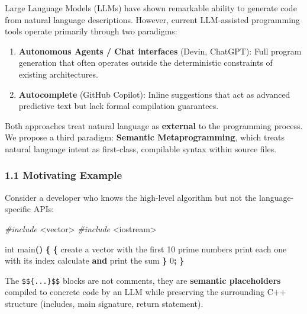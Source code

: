 \documentclass[11pt, a4paper]{article}
\providecommand{\tightlist}{\setlength{\itemsep}{0pt}\setlength{\parskip}{0pt}}
\newenvironment{Shaded}{\begin{snugshade}}{\end{snugshade}}
\newcommand{\DataTypeTok}[1]{\textcolor[rgb]{0.13,0.29,0.53}{#1}}
\newcommand{\DecValTok}[1]{\textcolor[rgb]{0.00,0.00,0.81}{#1}}
\newcommand{\ErrorTok}[1]{\textcolor[rgb]{0.64,0.00,0.00}{\textbf{#1}}}
\newcommand{\ImportTok}[1]{#1}
\newcommand{\KeywordTok}[1]{\textcolor[rgb]{0.13,0.29,0.53}{\textbf{#1}}}
\newcommand{\NormalTok}[1]{#1}
\newcommand{\OperatorTok}[1]{\textcolor[rgb]{0.81,0.36,0.00}{\textbf{#1}}}
\newcommand{\PreprocessorTok}[1]{\textcolor[rgb]{0.56,0.35,0.01}{\textit{#1}}}
\begin{document}
Large Language Models (LLMs) have shown remarkable ability to generate
code from natural language descriptions. However, current LLM-assisted
programming tools operate primarily through two paradigms:

\begin{enumerate}
\def\labelenumi{\arabic{enumi}.}
\tightlist
\item
  \textbf{Autonomous Agents / Chat interfaces} (Devin, ChatGPT): Full
  program generation that often operates outside the deterministic
  constraints of existing architectures.
\item
  \textbf{Autocomplete} (GitHub Copilot): Inline suggestions that act as
  advanced predictive text but lack formal compilation guarantees.
\end{enumerate}

Both approaches treat natural language as \textbf{external} to the
programming process. We propose a third paradigm: \textbf{Semantic
Metaprogramming}, which treats natural language intent as first-class,
compilable syntax within source files.

\subsubsection{1.1 Motivating Example}\label{motivating-example}

Consider a developer who knows the high-level algorithm but not the
language-specific APIs:

\begin{Shaded}
\begin{Highlighting}[]
\PreprocessorTok{\#include }\ImportTok{\textless{}vector\textgreater{}}
\PreprocessorTok{\#include }\ImportTok{\textless{}iostream\textgreater{}}

\DataTypeTok{int}\NormalTok{ main}\OperatorTok{()} \OperatorTok{\{}
    \ErrorTok{$$}\OperatorTok{\{}
\NormalTok{        create a vector with the first }\DecValTok{10}\NormalTok{ prime numbers}
\NormalTok{        print each one with its index}
\NormalTok{        calculate }\KeywordTok{and}\NormalTok{ print the sum}
    \OperatorTok{\}}\ErrorTok{$$}
     \DecValTok{0}\OperatorTok{;}
\OperatorTok{\}}
\end{Highlighting}
\end{Shaded}

The \texttt{\$\$\{...\}\$\$} blocks are not comments, they are
\textbf{semantic placeholders} compiled to concrete code by an LLM while
preserving the surrounding C++ structure (includes, main signature,
return statement).
\end{document}
